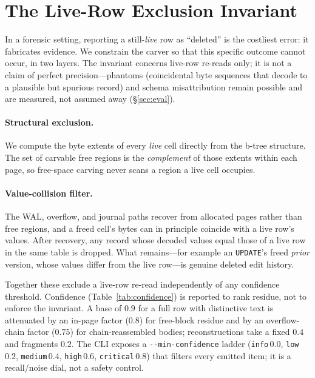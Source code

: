 \documentclass[10pt,a4paper]{article}
\newcommand{\code}[1]{\texttt{#1}}
\begin{document}
\section{The Live-Row Exclusion Invariant}\label{sec:fpzero}

In a forensic setting, reporting a still-\emph{live} row as ``deleted'' is the
costliest error: it fabricates evidence. We constrain the carver so that this
specific outcome cannot occur, in two layers. The invariant concerns live-row
re-reads only; it is not a claim of perfect precision---phantoms (coincidental byte
sequences that decode to a plausible but spurious record) and schema misattribution
remain possible and are measured, not assumed away (\S\ref{sec:eval}).

\paragraph{Structural exclusion.} We compute the byte extents of every \emph{live}
cell directly from the b-tree structure. The set of carvable free regions is the
\emph{complement} of those extents within each page, so free-space carving never
scans a region a live cell occupies.

\paragraph{Value-collision filter.} The WAL, overflow, and journal paths recover
from allocated pages rather than free regions, and a freed cell's bytes can in
principle coincide with a live row's values. After recovery, any record whose
decoded values equal those of a live row in the same table is dropped. What
remains---for example an \code{UPDATE}'s freed \emph{prior} version, whose values
differ from the live row---is genuine deleted edit history.

Together these exclude a live-row re-read independently of any confidence
threshold. Confidence (Table~\ref{tab:confidence}) is reported to rank residue, not
to enforce the invariant. A base of $0.9$ for a full row with distinctive text is
attenuated by an in-page factor ($0.8$) for free-block residue and by an
overflow-chain factor ($0.75$) for chain-reassembled bodies; reconstructions take a
fixed $0.4$ and fragments $0.2$. The CLI exposes a \code{-{}-min-confidence} ladder
(\code{info}\,$0.0$, \code{low}\,$0.2$, \code{medium}\,$0.4$, \code{high}\,$0.6$,
\code{critical}\,$0.8$) that filters every emitted item; it is a recall/noise dial,
not a safety control.
\end{document}
